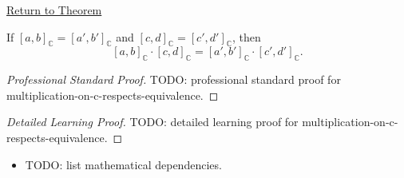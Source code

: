 \newpage
{}
\label{prf:multiplication-on-c-respects-equivalence}

\begin{remark*}[Return]
\hyperref[lem:multiplication-on-c-respects-equivalence]{Return to Theorem}
\end{remark*}

\begin{lemma*}
If $[a,b]_{\mathbb{C}}=[a',b']_{\mathbb{C}}$ and
$[c,d]_{\mathbb{C}}=[c',d']_{\mathbb{C}}$, then
\[
[a,b]_{\mathbb{C}}\cdot[c,d]_{\mathbb{C}}
=
[a',b']_{\mathbb{C}}\cdot[c',d']_{\mathbb{C}}.
\]
\end{lemma*}

\begin{proof}[Professional Standard Proof]
\LRAProofBodyStart
TODO: professional standard proof for multiplication-on-c-respects-equivalence.
\end{proof}

\begin{proof}[Detailed Learning Proof]
\LRAProofBodyStart
TODO: detailed learning proof for multiplication-on-c-respects-equivalence.
\end{proof}

\begin{remark*}
\end{remark*}

\begin{dependencies}
\begin{itemize}
  \item TODO: list mathematical dependencies.
\end{itemize}
\end{dependencies}

\clearpage
